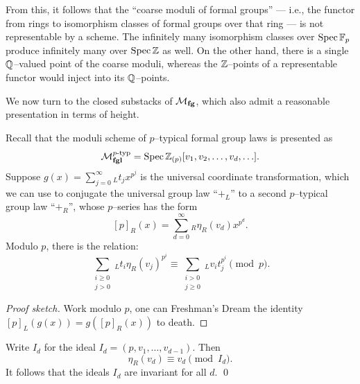 \begin{remark}
From this, it follows that the ``coarse moduli of formal groups'' --- i.e., the functor from rings to isomorphism classes of formal groups over that ring --- is not representable by a scheme.  The infinitely many isomorphism classes over $\operatorname{Spec} \mathbb F_p$ produce infinitely many over $\operatorname{Spec} \mathbb Z$ as well.  On the other hand, there is a single $\mathbb{Q}$--valued point of the coarse moduli, whereas the $\mathbb Z$--points of a representable functor would inject into its $\mathbb{Q}$--points.
\end{remark}

We now turn to the closed substacks of $\mathcal{M}_{\mathbf{fg}}$, which also admit a reasonable presentation in terms of height.

\begin{lemma}
Recall that the moduli scheme of $p$--typical formal group laws is presented as \[\mathcal{M}_{\mathbf{fgl}}^{p\text{-}\mathrm{typ}} = \operatorname{Spec} \mathbb Z_{(p)}[v_1, v_2, \ldots, v_d, \ldots].\]  Suppose $g(x) = \sum_{j=0}^\infty {}_L t_j x^{p^j}$ is the universal coordinate transformation, which we can use to conjugate the universal group law ``$+_L$'' to a second $p$--typical group law ``$+_R$'', whose $p$--series has the form \[[p]_R(x) = \sum_{d=0}^\infty {}_R \eta_R(v_d) x^{p^d}.\]  Modulo $p$, there is the relation:
\[\sum_{\substack{i \ge 0 \\ j > 0}}{}_L t_i \eta_R(v_j)^{p^i} \equiv \sum_{\substack{i > 0 \\ j \ge 0}}{}_L v_i t_j^{p^i} \pmod p.\]
\end{lemma}
\begin{proof}[Proof sketch]
Work modulo $p$, one can Freshman's Dream the identity $[p]_L(g(x)) = g([p]_R(x))$ to death.
\end{proof}


\begin{corollary}
Write $I_d$ for the ideal $I_d = (p, v_1, \ldots, v_{d-1})$.  Then \[\eta_R(v_d) \equiv v_d \pmod{I_d}.\]  It follows that the ideals $I_d$ are invariant for all $d$. \qed
\end{corollary}

